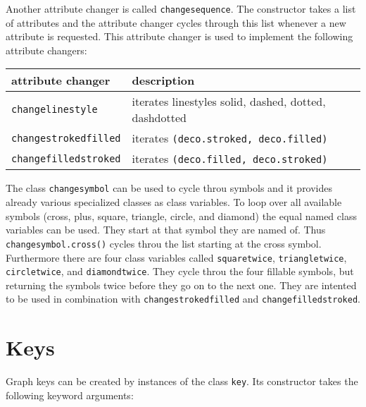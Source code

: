 Another attribute changer is called \verb|changesequence|. The
constructor takes a list of attributes and the attribute changer
cycles through this list whenever a new attribute is requested.
This attribute changer is used to implement the following attribute
changers:

\begin{center}
\begin{tabular}{ll}
attribute changer&description\\
\hline
\texttt{changelinestyle}&iterates linestyles solid, dashed, dotted, dashdotted\\
\texttt{changestrokedfilled}&iterates \texttt{(deco.stroked, deco.filled)}\\
\texttt{changefilledstroked}&iterates \texttt{(deco.filled, deco.stroked)}\\
\end{tabular}
\end{center}

The class \verb|changesymbol| can be used to cycle throu symbols and it
provides already various specialized classes as class variables. To
loop over all available symbols (cross, plus, square, triangle,
circle, and diamond) the equal named class variables can be used. They
start at that symbol they are named of. Thus \verb|changesymbol.cross()|
cycles throu the list starting at the cross symbol. Furthermore
there are four class variables called \verb|squaretwice|,
\verb|triangletwice|, \verb|circletwice|, and \verb|diamondtwice|.
They cycle throu the four fillable symbols, but returning the symbols
twice before they go on to the next one. They are intented to be used
in combination with \verb|changestrokedfilled| and
\verb|changefilledstroked|.

\section{Keys}

Graph keys can be created by instances of the class \verb|key|. Its
constructor takes the following keyword arguments:

